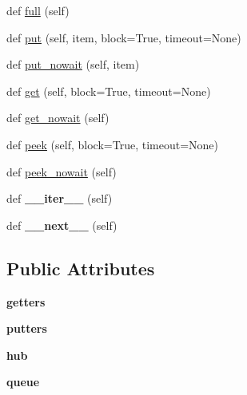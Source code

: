 \begin{DoxyCompactItemize}
\item 
def \hyperlink{classgevent_1_1queue_1_1_queue_a064875ef1eac4c3a222340e8feb34b60}{full} (self)
\item 
def \hyperlink{classgevent_1_1queue_1_1_queue_a75f86f125b819bd44599d45e826d9eed}{put} (self, item, block=True, timeout=None)
\item 
def \hyperlink{classgevent_1_1queue_1_1_queue_a0b820188057f94b37752fff18e6b21b8}{put\+\_\+nowait} (self, item)
\item 
def \hyperlink{classgevent_1_1queue_1_1_queue_a27dec76bb19989ba472c90d481b242e1}{get} (self, block=True, timeout=None)
\item 
def \hyperlink{classgevent_1_1queue_1_1_queue_af9b599f2a0608b43dd44d5ecff686c7c}{get\+\_\+nowait} (self)
\item 
def \hyperlink{classgevent_1_1queue_1_1_queue_a2591ab626ece2864d87f303ed58d967f}{peek} (self, block=True, timeout=None)
\item 
def \hyperlink{classgevent_1_1queue_1_1_queue_a90000a6a594083340c1123f84f4615ce}{peek\+\_\+nowait} (self)
\item 
\mbox{\label{classgevent_1_1queue_1_1_queue_ace4830f30380cca42d9ca773cd2fb3a6}} 
def {\bfseries \+\_\+\+\_\+iter\+\_\+\+\_\+} (self)
\item 
\mbox{\label{classgevent_1_1queue_1_1_queue_ab6ce782ab61b39abdeddcda907505162}} 
def {\bfseries \+\_\+\+\_\+next\+\_\+\+\_\+} (self)
\end{DoxyCompactItemize}
\subsection*{Public Attributes}
\begin{DoxyCompactItemize}
\item 
\mbox{\label{classgevent_1_1queue_1_1_queue_a9c1d1a2a6350a39af6041b2a64c94dce}} 
{\bfseries getters}
\item 
\mbox{\label{classgevent_1_1queue_1_1_queue_a5ea76376297989e90fdb47b592357cc8}} 
{\bfseries putters}
\item 
\mbox{\label{classgevent_1_1queue_1_1_queue_acab8fbb4e3dbfa5bc5cbc72c15c7f1f4}} 
{\bfseries hub}
\item 
\mbox{\label{classgevent_1_1queue_1_1_queue_a52c2aa05bacb8cd7e3fe5a8f85643551}} 
{\bfseries queue}
\end{DoxyCompactItemize}
